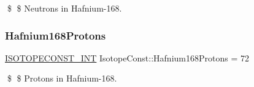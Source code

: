\$ \$ Neutrons in Hafnium-\/168. \mbox{\label{group___isotope_const-_hafnium-_hf168_ga3699cc4fcacce018fa1f925ca6da3abe}} 
\subsubsection{\texorpdfstring{Hafnium168\+Protons}{Hafnium168Protons}}
{\footnotesize\ttfamily \mbox{\hyperlink{group___isotope_const-_macros_ga5f18360b3e99483a35c32d789e62621c}{I\+S\+O\+T\+O\+P\+E\+C\+O\+N\+S\+T\+\_\+\+I\+NT}} Isotope\+Const\+::\+Hafnium168\+Protons = 72}

\$ \$ Protons in Hafnium-\/168. 
